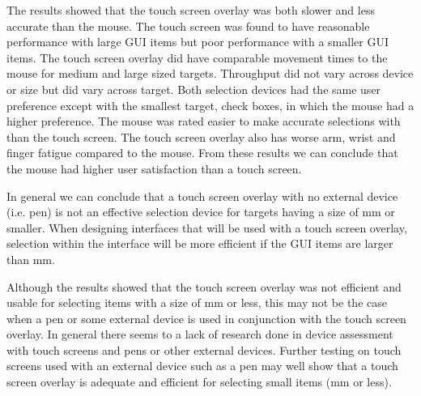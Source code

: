 \documentclass{elsart}
\begin{document}
The results showed that the touch screen overlay was both slower and
less accurate than the mouse. The touch screen was found to have
reasonable performance with large GUI items but poor performance with a
smaller GUI items. The touch screen overlay did have comparable movement
times to the mouse for medium and large sized targets. Throughput did
not vary across device or size but did vary across target. Both
selection devices had the same user preference except with the smallest
target, check boxes, in which the mouse had a higher preference. The
mouse was rated easier to make accurate selections with than the touch
screen. The touch screen overlay also has worse arm, wrist and finger
fatigue compared to the mouse. From these results we can conclude that
the mouse had higher user satisfaction than a touch screen.

In general we can conclude that a touch screen overlay with no external
device (i.e. pen) is not an effective selection device for targets
having a size of \unit[4]{mm} or smaller. When designing interfaces that
will be used with a touch screen overlay, selection within the interface
will be more efficient if the GUI items are larger than \unit[4]{mm}.

Although the results showed that the touch screen overlay was not
efficient and usable for selecting items with a size of \unit[4]{mm} or
less, this may not be the case when a pen or some external device is
used in conjunction with the touch screen overlay. In general there
seems to a lack of research done in device assessment with touch screens
and pens or other external devices. Further testing on touch screens
used with an external device such as a pen may well show that a touch
screen overlay is adequate and efficient for selecting small items
(\unit[4]{mm} or less).









% 
\end{document}
